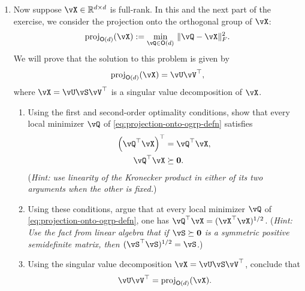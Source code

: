 \documentclass[\toplevelprefix/book-main.tex]{subfiles}
\begin{document}
\begin{exercise}
\begin{enumerate}
        \item Now suppose $\vX \in \R^{d\times d}$ is full-rank. In this and the next part of the exercise, we consider the projection onto the orthogonal group of $\vX$:
        \begin{equation}\label{eq:projection-onto-ogrp-defn}
            \mathrm{proj}_{\O(d)}(\vX) :=
            \min_{\vQ \in \O(d)
            }\, \norm{\vQ - \vX}_F^2.
        \end{equation}
        We will prove that the solution to this problem is given by
        \begin{equation*}
            \mathrm{proj}_{\O(d)}(\vX)
            =
            \vU \vV^\top,
        \end{equation*}
        where $\vX = \vU \vS \vV^\top$ is a singular value decomposition of $\vX$. 

        \begin{enumerate}
            \item Using the first and second-order optimality conditions, show that every local minimizer $\vQ$ of \eqref{eq:projection-onto-ogrp-defn} satisfies
            \begin{align*}
                \left( \vQ^\top \vX \right)^\top &= \vQ^\top \vX, \\
                \vQ^\top \vX &\succeq \mathbf{0}.
            \end{align*}
            (\textit{Hint: use linearity of the Kronecker product in either of its two arguments when the other is fixed.})
            \item Using these conditions, argue that at every local minimizer $\vQ$ of \eqref{eq:projection-onto-ogrp-defn}, one has $\vQ^\top \vX = (\vX^\top \vX)^{1/2}$.
            (\textit{Hint: Use %
            the fact from linear algebra that if $\vS \succeq \mathbf{0}$ is a symmetric positive semidefinite matrix, then $(\vS^\top\vS)^{1/2} = \vS$.})
            \item Using the singular value decomposition $\vX = \vU \vS \vV^\top$, conclude that
            \begin{equation*}
                \vU \vV^\top
                =
                \mathrm{proj}_{\O(d)}(\vX).
            \end{equation*}
        \end{enumerate}
    \end{enumerate}
\end{exercise}
\end{document}
